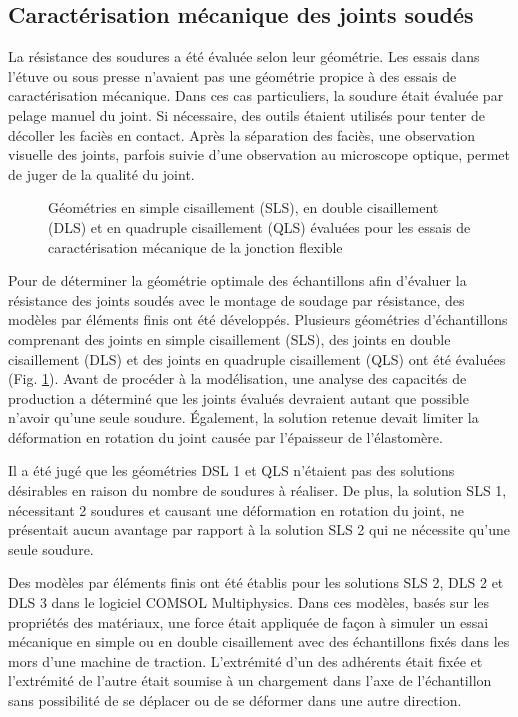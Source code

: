 \subsection{Caractérisation mécanique des joints soudés}

La résistance des soudures a été évaluée selon leur géométrie. 
Les essais dans l'étuve ou sous presse n'avaient pas une géométrie propice à des essais de caractérisation mécanique. 
Dans ces cas particuliers, la soudure était évaluée par pelage manuel du joint. 
Si nécessaire, des outils étaient utilisés pour tenter de décoller les faciès en contact. 
Après la séparation des faciès, une observation visuelle des joints, parfois suivie d'une observation au microscope optique, permet de juger de la qualité du joint. 

\begin{figure}[h]
	\centering
	
	\caption{Géométries en simple cisaillement (SLS), en double cisaillement (DLS) et en quadruple cisaillement (QLS) évaluées pour les essais de caractérisation mécanique de la jonction flexible}
	\label{fig:geometrie_echantillons}
\end{figure}
\FloatBarrier

Pour de déterminer la géométrie optimale des échantillons afin d'évaluer la résistance des joints soudés avec le montage de soudage par résistance, des modèles par éléments finis ont été développés. 
Plusieurs géométries d'échantillons comprenant des joints en simple cisaillement (SLS), des joints en double cisaillement (DLS) et des joints en quadruple cisaillement (QLS) ont été évaluées (Fig. \ref{fig:geometrie_echantillons}). 
Avant de procéder à la modélisation, une analyse des capacités de production a déterminé que les joints évalués devraient autant que possible n'avoir qu'une seule soudure. 
Également, la solution retenue devait limiter la déformation en rotation du joint causée par l'épaisseur de l'élastomère. 

Il a été jugé que les géométries DSL 1 et QLS n'étaient pas des solutions désirables en raison du nombre de soudures à réaliser. 
De plus, la solution SLS 1, nécessitant 2 soudures et causant une déformation en rotation du joint, ne présentait aucun avantage par rapport à la solution SLS 2 qui ne nécessite qu'une seule soudure. 

Des modèles par éléments finis ont été établis pour les solutions SLS 2, DLS 2 et DLS 3 dans le logiciel COMSOL Mul\-ti\-phy\-sics\-\textregistered . 
Dans ces modèles, basés sur les propriétés des matériaux, une force était appliquée de façon à simuler un essai mécanique en simple ou en double cisaillement avec des échantillons fixés dans les mors d'une machine de traction. 
L'extrémité d'un des adhérents était fixée et l'extrémité de l'autre était soumise à un chargement dans l'axe de l'échantillon sans possibilité de se déplacer ou de se déformer dans une autre direction. 

